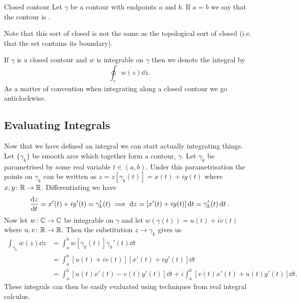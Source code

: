\documentclass{article}
\begin{document}
    \begin{definition}{Closed contour}{}
        Let \(\gamma\) be a contour with endpoints \(a\) and \(b\).
        If \(a = b\) we say that the contour is .
    \end{definition}
    Note that this sort of closed is not the same as the topological sort of closed (i.e. that the set contains its boundary).
    \begin{notation*}{}
        If \(\gamma\) is a closed contour and \(w\) is integrable on \(\gamma\) then we denote the integral by
        \[\oint_{\gamma} w(z) \dd{z}.\]
        As a matter of convention when integrating along a closed contour we go anticlockwise.
    \end{notation*}
    
    \subsection{Evaluating Integrals}
    Now that we have defined an integral we can start actually integrating things.
    Let \(\{\gamma_k\}\) be smooth arcs which together form a contour, \(\gamma\).
    Let \(\gamma_k\) be parametrised by some real variable \(t \in (a, b)\).
    Under this parametrisation the points on \(\gamma_k\) can be written as \(z = z[\gamma_k(t)] = x(t) + iy(t)\) where \(x, y\colon\mathbb{R}\to\mathbb{R}\).
    Differentiating we have
    \[\dv{z}{t} = x'(t) + iy'(t) = \gamma_k'(t) \implies \dd{z} = [x'(t) + iy(t)]\dd{t} = \gamma_k'(t)\dd{t}.\]
    Now let \(w\colon\mathbb{C}\to\mathbb{C}\) be integrable on \(\gamma\) and let \(w(\gamma(t)) = u(t) + iv(t)\) where \(u, v\colon\mathbb{R}\to\mathbb{R}\).
    Then the substitution \(z\to\gamma_k\) gives us
    \begin{align*}
        \int_{\gamma_k} w(z)\dd{z} &= \int_a^b w[\gamma_k(t)] \gamma_k'(t) \dd{t}\\
        &= \int_a^b [u(t) + iv(t)][x'(t) + iy'(t)] \dd{t}\\
        &= \int_a^b [u(t)x'(t) - v(t)y'(t)]\dd{t} + i\int_a^b [v(t)x'(t) + u(t)y'(t)]\dd{t}.
    \end{align*}
    These integrals can then be easily evaluated using techniques from real integral calculus.
    
\end{document}
